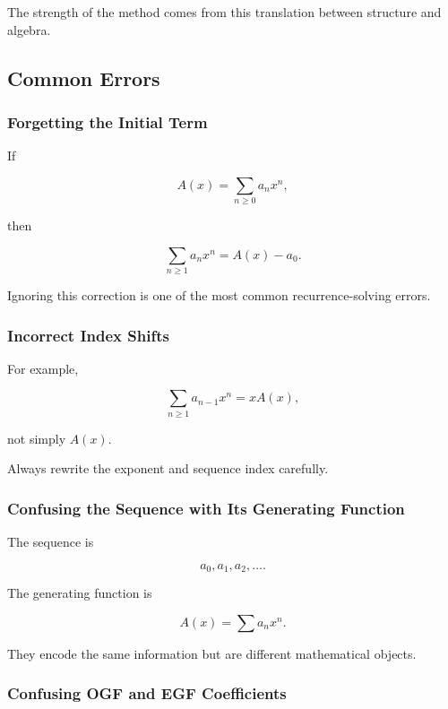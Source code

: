 The strength of the method comes from this translation between
structure and algebra.

\subsection{Common Errors}
\label{subsec:generating-functions-common-errors}

\subsubsection{Forgetting the Initial Term}

If

\[
A(x)
=
\sum_{n\geq0}a_nx^n,
\]

then

\[
\sum_{n\geq1}a_nx^n
=
A(x)-a_0.
\]

Ignoring this correction is one of the most common recurrence-solving
errors.

\subsubsection{Incorrect Index Shifts}

For example,

\[
\sum_{n\geq1}a_{n-1}x^n
=
xA(x),
\]

not simply \(A(x)\).

Always rewrite the exponent and sequence index carefully.

\subsubsection{Confusing the Sequence with Its Generating Function}

The sequence is

\[
a_0,a_1,a_2,\ldots.
\]

The generating function is

\[
A(x)
=
\sum a_nx^n.
\]

They encode the same information but are different mathematical
objects.

\subsubsection{Confusing OGF and EGF Coefficients}

